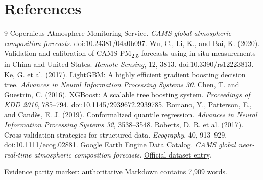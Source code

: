 \documentclass[11pt,a4paper]{article}
\begin{document}
\section{References}
\begin{thebibliography}{9}
 Copernicus Atmosphere Monitoring Service. \emph{CAMS global atmospheric composition forecasts}. \href{https://doi.org/10.24381/04a0b097}{doi:10.24381/04a0b097}.
 Wu, C., Li, K., and Bai, K. (2020). Validation and calibration of CAMS PM\textsubscript{2.5} forecasts using in situ measurements in China and United States. \emph{Remote Sensing}, 12, 3813. \href{https://doi.org/10.3390/rs12223813}{doi:10.3390/rs12223813}.
 Ke, G. et al. (2017). LightGBM: A highly efficient gradient boosting decision tree. \emph{Advances in Neural Information Processing Systems 30}.
 Chen, T. and Guestrin, C. (2016). XGBoost: A scalable tree boosting system. \emph{Proceedings of KDD 2016}, 785--794. \href{https://doi.org/10.1145/2939672.2939785}{doi:10.1145/2939672.2939785}.
 Romano, Y., Patterson, E., and Candès, E. J. (2019). Conformalized quantile regression. \emph{Advances in Neural Information Processing Systems 32}, 3538--3548.
 Roberts, D. R. et al. (2017). Cross-validation strategies for structured data. \emph{Ecography}, 40, 913--929. \href{https://doi.org/10.1111/ecog.02881}{doi:10.1111/ecog.02881}.
 Google Earth Engine Data Catalog. \emph{CAMS global near-real-time atmospheric composition forecasts}. \href{https://developers.google.com/earth-engine/datasets/catalog/ECMWF_CAMS_NRT}{Official dataset entry}.
\end{thebibliography}

\vfill
\begin{center}\footnotesize Evidence parity marker: authoritative Markdown contains 7,909 words.\end{center}
\end{document}
